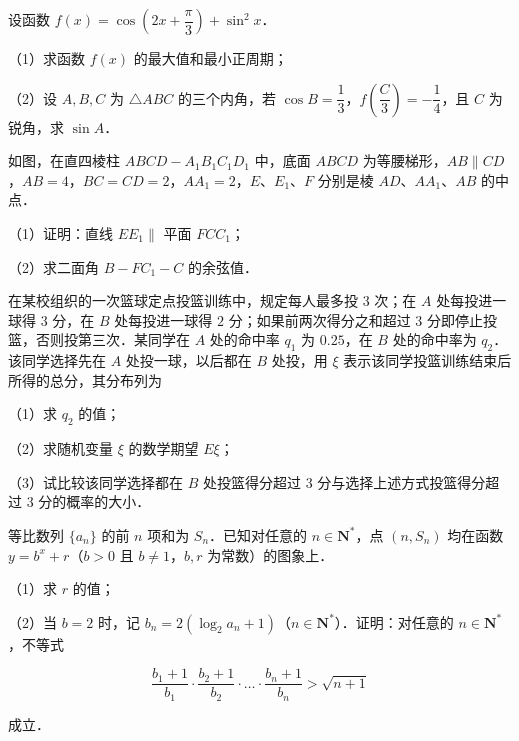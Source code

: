 \begin{question}
设函数 $f(x)=\cos\left(2x+\dfrac{\pi}{3}\right)+\sin^2x$．

（1）求函数 $f(x)$ 的最大值和最小正周期；

（2）设 $A,B,C$ 为 $\triangle ABC$ 的三个内角，若 $\cos B=\dfrac13$，$f\left(\dfrac C3\right)=-\dfrac14$，且 $C$ 为锐角，求 $\sin A$．

\Needspace{0.4\textheight}
\end{question}
\begin{question}
如图，在直四棱柱 $ABCD-A_1B_1C_1D_1$ 中，底面 $ABCD$ 为等腰梯形，$AB\parallel CD$，$AB=4$，$BC=CD=2$，$AA_1=2$，$E$、$E_1$、$F$ 分别是棱 $AD$、$AA_1$、$AB$ 的中点．
\nopagebreak[4]
\begin{center}\end{center}
\nopagebreak[4]
（1）证明：直线 $EE_1\parallel$ 平面 $FCC_1$；

（2）求二面角 $B-FC_1-C$ 的余弦值．

\Needspace{0.4\textheight}
\end{question}
\begin{question}
在某校组织的一次篮球定点投篮训练中，规定每人最多投 $3$ 次；在 $A$ 处每投进一球得 $3$ 分，在 $B$ 处每投进一球得 $2$ 分；如果前两次得分之和超过 $3$ 分即停止投篮，否则投第三次．某同学在 $A$ 处的命中率 $q_1$ 为 $0.25$，在 $B$ 处的命中率为 $q_2$．该同学选择先在 $A$ 处投一球，以后都在 $B$ 处投，用 $\xi$ 表示该同学投篮训练结束后所得的总分，其分布列为
\nopagebreak[4]
\begin{center}\end{center}
\nopagebreak[4]
（1）求 $q_2$ 的值；

（2）求随机变量 $\xi$ 的数学期望 $E\xi$；

（3）试比较该同学选择都在 $B$ 处投篮得分超过 $3$ 分与选择上述方式投篮得分超过 $3$ 分的概率的大小．

\end{question}
\begin{question}
等比数列 $\{a_n\}$ 的前 $n$ 项和为 $S_n$．已知对任意的 $n\in\mathbf N^*$，点 $(n,S_n)$ 均在函数 $y=b^x+r$（$b>0$ 且 $b\neq1$，$b,r$ 为常数）的图象上．

（1）求 $r$ 的值；

（2）当 $b=2$ 时，记 $b_n=2(\log_2a_n+1)$（$n\in\mathbf N^*$）．证明：对任意的 $n\in\mathbf N^*$，不等式

\nopagebreak[4]
\[\frac{b_1+1}{b_1}\cdot\frac{b_2+1}{b_2}\cdot\ldots\cdot\frac{b_n+1}{b_n}>\sqrt{n+1}\]

成立．

\end{question}
